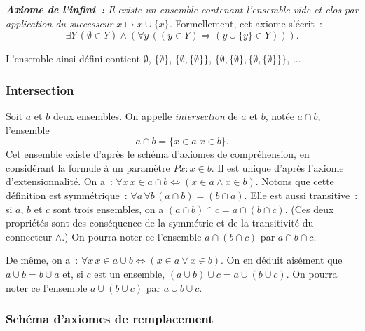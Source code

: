 \medskip

\noindent\textit{\textbf{Axiome de l'infini :} Il existe un ensemble contenant l'ensemble vide et clos par application du successeur $x \mapsto x \cup \lbrace x \rbrace$.} Formellement, cet axiome s'écrit : 
\begin{equation*}
    \exists Y \, (\emptyset \in Y) \wedge (\forall y \, ((y \in Y) \Rightarrow (y \cup \lbrace y \rbrace \in Y))). 
\end{equation*}

\medskip

L'ensemble ainsi défini contient $\emptyset$, $\lbrace \emptyset \rbrace$, $\lbrace \emptyset, \lbrace \emptyset \rbrace \rbrace$, $\lbrace \emptyset, \lbrace \emptyset \rbrace, \lbrace \emptyset, \lbrace \emptyset \rbrace \rbrace \rbrace$, ...

\subsubsection{Intersection} 

Soit $a$ et $b$ deux ensembles. 
On appelle \textit{intersection} de $a$ et $b$, notée $a \cap b$, l'ensemble 
\begin{equation*}
    a \cap b = \lbrace x \in a \vert x \in b \rbrace. 
\end{equation*}
Cet ensemble existe d'après le schéma d'axiomes de compréhension, en considérant la formule à un paramètre $P x: x \in b$. 
Il est unique d'après l'axiome d'extensionnalité.
On a : $\forall x \, x \in a \cap b \Leftrightarrow (x \in a \wedge x \in b)$. 
Notons que cette définition est symmétrique : $\forall a \, \forall b \, (a \cap b) = (b \cap a)$.  
Elle est aussi transitive : si $a$, $b$ et $c$ sont trois ensembles, on a $(a \cap b) \cap c = a \cap (b \cap c)$. 
(Ces deux propriétés sont des conséquence de la symmétrie et de la transitivité du connecteur $\wedge$.)
On pourra noter ce l'ensemble $a \cap (b \cap c)$ par $a \cap b \cap c$. 

De même, on a : $\forall x \, x \in a \cup b \Leftrightarrow (x \in a \vee x \in b)$. 
On en déduit aisément que $a \cup b = b \cup a$ et, si $c$ est un ensemble, $(a \cup b) \cup c = a \cup (b \cup c)$. 
On pourra noter ce l'ensemble $a \cup (b \cup c)$ par $a \cup b \cup c$. 

\subsubsection{Schéma d'axiomes de remplacement}


